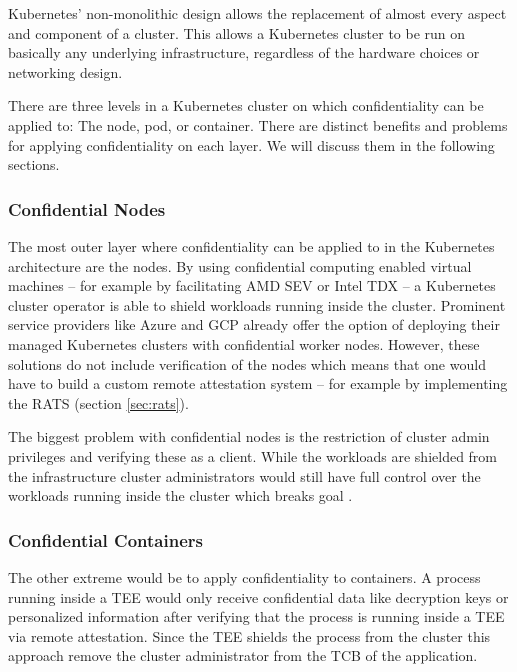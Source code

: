 
Kubernetes' non-monolithic design allows the replacement of almost every aspect
and component of a cluster. This allows a Kubernetes cluster to be run on
basically any underlying infrastructure, regardless of the hardware choices or
networking design.

There are three levels in a Kubernetes cluster on which confidentiality can be
applied to: The node, pod, or container. There are distinct benefits and
problems for applying confidentiality on each layer. We will discuss them in the
following sections.

\subsubsection{Confidential Nodes}

The most outer layer where confidentiality can be applied to in the Kubernetes
architecture are the nodes. By using confidential computing enabled virtual
machines -- for example by facilitating AMD SEV or Intel TDX -- a Kubernetes
cluster operator is able to shield workloads running inside the cluster.
Prominent service providers like Azure and GCP already offer the option of
deploying their managed Kubernetes clusters with confidential worker nodes.
However, these solutions do not include verification of the nodes which means
that one would have to build a custom remote attestation system -- for example
by implementing the RATS (section \ref{sec:rats}).

The biggest problem with confidential nodes is the restriction of cluster admin
privileges and verifying these as a client. While the workloads are shielded
from the infrastructure cluster administrators would still have full control
over the workloads running inside the cluster which breaks goal
.

\subsubsection{Confidential Containers}

The other extreme would be to apply confidentiality to containers. A process
running inside a TEE would only receive confidential data like decryption keys
or personalized information after verifying that the process is running inside a
TEE via remote attestation. Since the TEE shields the process from the cluster
this approach remove the cluster administrator from the TCB of the application.

